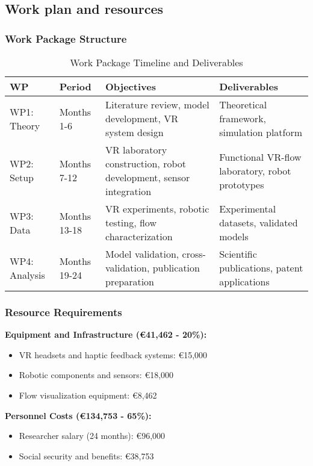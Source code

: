 \documentclass[11pt,a4paper]{article}
\newcommand{\highlight}[1]{\textbf{\color{blue!70!black} #1}}
\begin{document}
\subsection{Work plan and resources}

\subsubsection{Work Package Structure}

\begin{table}[h]
\centering
\caption{Work Package Timeline and Deliverables}
\begin{tabular}{|p{2cm}|p{3cm}|p{6cm}|p{3cm}|}
\hline
\textbf{WP} & \textbf{Period} & \textbf{Objectives} & \textbf{Deliverables} \\
\hline
WP1: Theory & Months 1-6 & Literature review, model development, VR system design & Theoretical framework, simulation platform \\
\hline
WP2: Setup & Months 7-12 & VR laboratory construction, robot development, sensor integration & Functional VR-flow laboratory, robot prototypes \\
\hline
WP3: Data & Months 13-18 & VR experiments, robotic testing, flow characterization & Experimental datasets, validated models \\
\hline
WP4: Analysis & Months 19-24 & Model validation, cross-validation, publication preparation & Scientific publications, patent applications \\
\hline
\end{tabular}
\end{table}

\subsubsection{Resource Requirements}

\highlight{Equipment and Infrastructure (€41,462 - 20\%):}
\begin{itemize}[noitemsep]
\item VR headsets and haptic feedback systems: €15,000
\item Robotic components and sensors: €18,000
\item Flow visualization equipment: €8,462
\end{itemize}

\highlight{Personnel Costs (€134,753 - 65\%):}
\begin{itemize}[noitemsep]
\item Researcher salary (24 months): €96,000
\item Social security and benefits: €38,753
\end{itemize}
\end{document}
